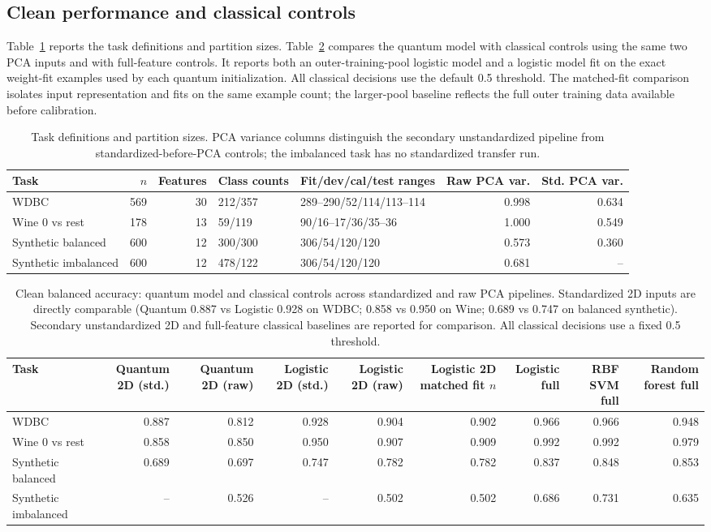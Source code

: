 \documentclass[conference]{IEEEtran}
\begin{document}
\subsection{Clean performance and classical controls}
Table~\ref{tab:datasets} reports the task definitions and partition sizes. Table~\ref{tab:classical} compares the quantum model with classical controls using the same two PCA inputs and with full-feature controls. It reports both an outer-training-pool logistic model and a logistic model fit on the exact weight-fit examples used by each quantum initialization. All classical decisions use the default 0.5 threshold. The matched-fit comparison isolates input representation and fits on the same example count; the larger-pool baseline reflects the full outer training data available before calibration.
\begin{table}[t]\centering\scriptsize
\caption{Task definitions and partition sizes. PCA variance columns distinguish the secondary unstandardized pipeline from standardized-before-PCA controls; the imbalanced task has no standardized transfer run.}
\label{tab:datasets}
\begin{tabular}{@{}l r r l l r r@{}}\toprule
Task & $n$ & Features & Class counts & Fit/dev/cal/test ranges & Raw PCA var. & Std. PCA var. \\
\midrule
WDBC & 569 & 30 & 212/357 & 289--290/52/114/113--114 & 0.998 & 0.634 \\
Wine 0 vs rest & 178 & 13 & 59/119 & 90/16--17/36/35--36 & 1.000 & 0.549 \\
Synthetic balanced & 600 & 12 & 300/300 & 306/54/120/120 & 0.573 & 0.360 \\
Synthetic imbalanced & 600 & 12 & 478/122 & 306/54/120/120 & 0.681 & -- \\
\bottomrule\end{tabular}\end{table}
\begin{table}[t]\centering\scriptsize
\caption{Clean balanced accuracy: quantum model and classical controls across standardized and raw PCA pipelines. Standardized 2D inputs are directly comparable (Quantum 0.887 vs Logistic 0.928 on WDBC; 0.858 vs 0.950 on Wine; 0.689 vs 0.747 on balanced synthetic). Secondary unstandardized 2D and full-feature classical baselines are reported for comparison. All classical decisions use a fixed 0.5 threshold.}
\label{tab:classical}
\begin{tabular}{@{}l r r r r r r r r@{}}\toprule
Task & Quantum 2D (std.) & Quantum 2D (raw) & Logistic 2D (std.) & Logistic 2D (raw) & Logistic 2D matched fit $n$ & Logistic full & RBF SVM full & Random forest full \\
\midrule
WDBC & 0.887 & 0.812 & 0.928 & 0.904 & 0.902 & 0.966 & 0.966 & 0.948 \\
Wine 0 vs rest & 0.858 & 0.850 & 0.950 & 0.907 & 0.909 & 0.992 & 0.992 & 0.979 \\
Synthetic balanced & 0.689 & 0.697 & 0.747 & 0.782 & 0.782 & 0.837 & 0.848 & 0.853 \\
Synthetic imbalanced & -- & 0.526 & -- & 0.502 & 0.502 & 0.686 & 0.731 & 0.635 \\
\bottomrule\end{tabular}\end{table}
\end{document}
